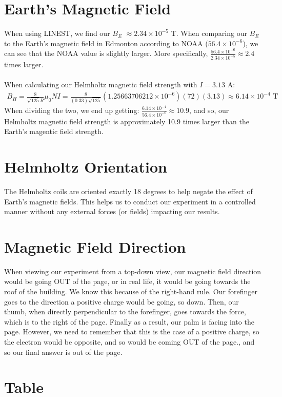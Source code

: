 \documentclass[12pt]{article}
\begin{document}
\section{Earth's Magnetic Field}
When using LINEST, we find our $B_E$ $\approx 2.34 \times 10^{-5}$ T.
When comparing our $B_E$ to the Earth's magnetic field in Edmonton according to NOAA ($56.4 \times 10^{-6}$), we can see that
the NOAA value is slightly larger. More specifically, $\frac{56.4 \times 10^{-6}}{2.34 \times 10^{-5}} \approx 2.4$ times larger.
\\ \\
\noindent When calculating our Helmholtz magnetic field strength with $I = 3.13$ A:
\begin{align*}
    B_H = \frac{8}{\sqrt{125}R}\mu_0NI = \frac{8}{(0.33)\sqrt{125}}(1.25663706212 \times 10^{-6})(72)(3.13) \approx 6.14 \times 10^{-4}\text{ T}
\end{align*}
When dividing the two, we end up getting: $\frac{6.14 \times 10^{-4}}{56.4 \times 10^{-6}} \approx 10.9$, and so, our Helmholtz magnetic
field strength is approximately 10.9 times larger than the Earth's magentic field strength.
\section{Helmholtz Orientation}
The Helmholtz coils are oriented exactly 18 degrees to help negate the effect of Earth's magnetic fields. This helps
us to conduct our experiment in a controlled manner without any external forces (or fields) impacting our results.
\section{Magnetic Field Direction}
When viewing our experiment from a top-down view, our magnetic field direction would be going OUT of the page, or in real life, it would be going towards
the roof of the building. We know this because of the right-hand rule. Our forefinger goes to the direction a positive charge would be going, so down.
Then, our thumb, when directly perpendicular to the forefinger, goes towards the force, which is to the right of the page.
Finally as a result, our palm is facing into the page. However, we need to remember that this is the case of a positive charge, so the electron would be opposite, and so
would be coming OUT of the page., and so our final answer is out of the page.

\section{Table}
\end{document}
